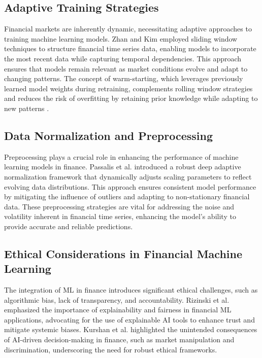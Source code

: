 \documentclass[10pt,twocolumn]{article}
\begin{document}
\subsection{Adaptive Training Strategies}

Financial markets are inherently dynamic, necessitating adaptive approaches to training machine learning models. Zhan and Kim \cite{Zhan2024SlidingWindow} employed sliding window techniques to structure financial time series data, enabling models to incorporate the most recent data while capturing temporal dependencies. This approach ensures that models remain relevant as market conditions evolve and adapt to changing patterns. The concept of warm-starting, which leverages previously learned model weights during retraining, complements rolling window strategies and reduces the risk of overfitting by retaining prior knowledge while adapting to new patterns \cite{Ash2019WarmStarting}.

\subsection{Data Normalization and Preprocessing}

Preprocessing plays a crucial role in enhancing the performance of machine learning models in finance. Passalis et al. \cite{Passalis2021RobustNormalization} introduced a robust deep adaptive normalization framework that dynamically adjusts scaling parameters to reflect evolving data distributions. This approach ensures consistent model performance by mitigating the influence of outliers and adapting to non-stationary financial data. These preprocessing strategies are vital for addressing the noise and volatility inherent in financial time series, enhancing the model's ability to provide accurate and reliable predictions.

\subsection{Ethical Considerations in Financial Machine Learning}

The integration of ML in finance introduces significant ethical challenges, such as algorithmic bias, lack of transparency, and accountability. Rizinski et al. \cite{Rizinski2022EthicalMLFintech} emphasized the importance of explainability and fairness in financial ML applications, advocating for the use of explainable AI tools to enhance trust and mitigate systemic biases. Kurshan et al. \cite{Kurshan2021FairEthicalAI} highlighted the unintended consequences of AI-driven decision-making in finance, such as market manipulation and discrimination, underscoring the need for robust ethical frameworks.
\end{document}
